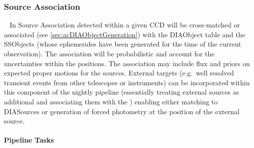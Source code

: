 \subsubsection{Source Association}~
\label{sec:apSourceAssoc}
In Source Association \DIASources detected within a given CCD will be cross-matched or associated (see \ref{sec:acDIAObjectGeneration}) with the DIAObject table and the SSObjects (whose ephemerides have been generated for the time of the current observation). The association will be probabilistic  and account for the uncertainties within the positions. The association may include flux and priors on expected proper motions for the sources. External targets (e.g.\ well resolved transient events from other telescopes or instruments) can be incorporated within this component of the nightly pipeline (essentially treating external sources as additional \DIAObjects and associating them with the \DIASources) enabling either matching to DIASources or generation of forced photometry at the position of the external source. 

\paragraph{Pipeline Tasks}

